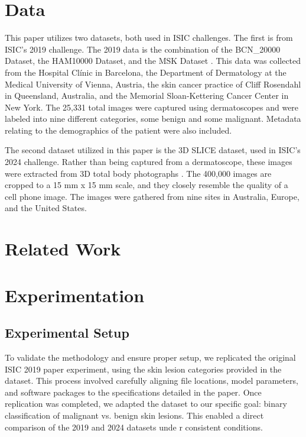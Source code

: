 \documentclass{article}
\begin{document}
\section{Data}

This paper utilizes two datasets, both used in ISIC challenges. The first is from ISIC’s 2019 challenge. The 2019 data is the combination of the 
BCN\_20000 Dataset, the HAM10000 Dataset, and the MSK Dataset \cite{bcn20000,ham10000,msk}. This data was collected from the Hospital Clínic in Barcelona, the Department of 
Dermatology at the Medical University of Vienna, Austria, the skin cancer practice of Cliff Rosendahl in Queensland, Australia, and the Memorial 
Sloan-Kettering Cancer Center in New York. The 25,331 total images were captured using dermatoscopes and were labeled into nine different 
categories, some benign and some malignant. Metadata relating to the demographics of the patient were also included.

The second dataset utilized in this paper is the 3D SLICE dataset, used in ISIC’s 2024 challenge. Rather than being captured from a dermatoscope, these images were extracted from 3D total body photographs \cite{slice3d}. The 400,000 images are cropped to a 15 mm x 15 mm scale, and they closely resemble the quality of a cell phone image. The images were gathered from nine sites in Australia, Europe, and the United States.

\section{Related Work}


\section{Experimentation}

\subsection{Experimental Setup}

To validate the methodology and ensure proper setup, we replicated the original ISIC 2019 paper experiment,
using the skin lesion categories provided in the dataset. This process involved carefully aligning file locations,
model parameters, and software packages to the specifications detailed in the paper. Once replication was
completed, we adapted the dataset to our specific goal: binary classification of malignant vs. benign skin lesions.
This enabled a direct comparison of the 2019 and 2024 datasets unde r consistent conditions.
\end{document}
